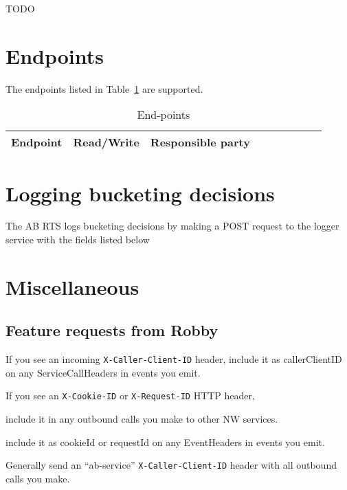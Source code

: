 \documentclass[letterpaper]{article}
\begin{document}
TODO \TBC 

\section{Endpoints}
The endpoints listed in Table~\ref{tbl_endpoints} are supported.
\begin{table}[hb]
\centering
\begin{tabular}{|l||l|l|l|l|l|l|l|l|}  \hline \hline
  {\bf Endpoint } & {\bf Read/Write} & {\bf Responsible party} \\ \hline \hline

\hline
\end{tabular}
\caption{End-points}
\label{tbl_endpoints}
\end{table}

\section{Logging bucketing decisions}

The AB RTS logs bucketing decisions by making a POST request to the logger
service with the fields listed below


\TBC

\section{Miscellaneous}
\subsection{Feature requests from Robby}
\be
\item 
If you see an incoming \verb+X-Caller-Client-ID+ header, 
include it as callerClientID on any ServiceCallHeaders in events you emit.
\item If you see an \verb+X-Cookie-ID+ or \verb+X-Request-ID+ HTTP header, 
\be
\item include it in any outbound calls you make to other NW services.
\item include it as cookieId or requestId on any EventHeaders in events you emit.
\ee
\item Generally send an ``ab-service'' \verb+X-Caller-Client-ID+ header 
with all outbound calls you make.
\ee
\end{document}
